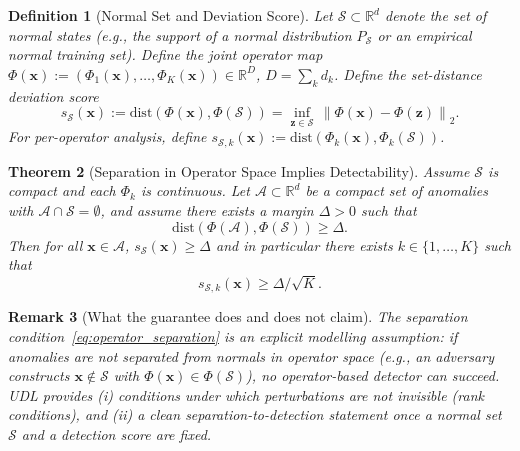 \documentclass{article}
\newtheorem{theorem}{Theorem}
\newtheorem{definition}[theorem]{Definition}
\newtheorem{remark}[theorem]{Remark}
\newcommand{\R}{\mathbb{R}}
\newcommand{\Nset}{\mathcal{S}}  %
\newcommand{\norm}[1]{\left\lVert#1\right\rVert}
\begin{document}
\begin{definition}[Normal Set and Deviation Score]
\label{def:normal_set}
Let $\Nset \subset \R^d$ denote the set of normal states (e.g., the support of a normal distribution $P_\Nset$ or an empirical normal training set). Define the joint operator map $\Phi(\mathbf{x}) := (\Phi_1(\mathbf{x}),\ldots,\Phi_K(\mathbf{x})) \in \R^{D}$, $D=\sum_k d_k$. Define the set-distance deviation score
\begin{equation}
s_\Nset(\mathbf{x}) := \mathrm{dist}(\Phi(\mathbf{x}),\Phi(\Nset)) = \inf_{\mathbf{z}\in \Nset}\, \norm{\Phi(\mathbf{x})-\Phi(\mathbf{z})}_2.
\label{eq:set_score}
\end{equation}
For per-operator analysis, define $s_{\Nset,k}(\mathbf{x}) := \mathrm{dist}(\Phi_k(\mathbf{x}),\Phi_k(\Nset))$.
\end{definition}

\begin{theorem}[Separation in Operator Space Implies Detectability]
\label{thm:separation}
Assume $\Nset$ is compact and each $\Phi_k$ is continuous. Let $\mathcal{A}\subset\R^d$ be a compact set of anomalies with $\mathcal{A}\cap \Nset=\emptyset$, and assume there exists a margin $\Delta>0$ such that
\begin{equation}
\mathrm{dist}(\Phi(\mathcal{A}),\Phi(\Nset)) \ge \Delta.
\label{eq:operator_separation}
\end{equation}
Then for all $\mathbf{x}\in\mathcal{A}$, $s_\Nset(\mathbf{x})\ge \Delta$ and in particular there exists $k\in\{1,\ldots,K\}$ such that
\begin{equation}
s_{\Nset,k}(\mathbf{x}) \ge \Delta/\sqrt{K}.
\end{equation}
\end{theorem}

\begin{remark}[What the guarantee does and does not claim]
\label{rem:detection_scope}
The separation condition~\eqref{eq:operator_separation} is an explicit modelling assumption: if anomalies are not separated from normals in operator space (e.g., an adversary constructs $\mathbf{x}\notin\Nset$ with $\Phi(\mathbf{x})\in\Phi(\Nset)$), no operator-based detector can succeed. UDL provides (i) conditions under which perturbations are not invisible (rank conditions), and (ii) a clean separation-to-detection statement once a normal set $\Nset$ and a detection score are fixed.
\end{remark}
\end{document}
